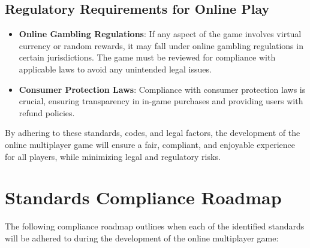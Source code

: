 \subsection{Regulatory Requirements for Online Play}
\begin{itemize}
    \item \textbf{Online Gambling Regulations}: If any aspect of the game involves virtual currency or random rewards, it may fall under online gambling regulations in certain jurisdictions. The game must be reviewed for compliance with applicable laws to avoid any unintended legal issues.
    \item \textbf{Consumer Protection Laws}: Compliance with consumer protection laws is crucial, ensuring transparency in in-game purchases and providing users with refund policies.
\end{itemize}

By adhering to these standards, codes, and legal factors, the development of the online multiplayer game will ensure a fair, compliant, and enjoyable experience for all players, while minimizing legal and regulatory risks.

\section{Standards Compliance Roadmap}

The following compliance roadmap outlines when each of the identified standards will be adhered to during the development of the online multiplayer game:


